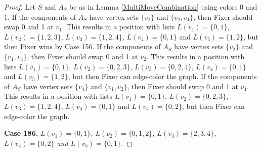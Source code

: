 \documentclass[12pt]{amsart}
\theoremstyle{plain}
\theoremstyle{definition}
\theoremstyle{remark}
\begin{document}
\begin{proof}
Let $S$ and $A_S$ be as in Lemma \ref{MultiMoveCombination} using colors $0$ and $1$. If the components of $A_S$ have vertex sets $\{v_1\}$ and $\{v_2, v_4\}$, then Fixer should swap 0 and 1 at $v_1$. This results in a position with lists $L(v_1) = \{0, 1\}$, $L(v_2) = \{1, 2, 3\}$, $L(v_3) = \{1, 2, 4\}$, $L(v_4) = \{0, 1\}$ and $L(v_5) = \{1, 2\}$, but then Fixer wins by Case 156.
If the components of $A_S$ have vertex sets $\{v_2\}$ and $\{v_1, v_4\}$, then Fixer should swap 0 and 1 at $v_2$. This results in a position with lists $L(v_1) = \{0, 1\}$, $L(v_2) = \{0, 2, 3\}$, $L(v_3) = \{0, 2, 4\}$, $L(v_4) = \{0, 1\}$ and $L(v_5) = \{1, 2\}$, but then Fixer can edge-color the graph.
If the components of $A_S$ have vertex sets $\{v_4\}$ and $\{v_1, v_2\}$, then Fixer should swap 0 and 1 at $v_4$. This results in a position with lists $L(v_1) = \{0, 1\}$, $L(v_2) = \{0, 2, 3\}$, $L(v_3) = \{1, 2, 4\}$, $L(v_4) = \{0, 1\}$ and $L(v_5) = \{0, 2\}$, but then Fixer can edge-color the graph.

\noindent\textbf{Case 186.  }\textit{$L(v_1) = \{0, 1\}$, $L(v_2) = \{0, 1, 2\}$, $L(v_3) = \{2, 3, 4\}$, $L(v_4) = \{0, 2\}$ and $L(v_5) = \{0, 1\}$.}


\end{proof}
\end{document}

